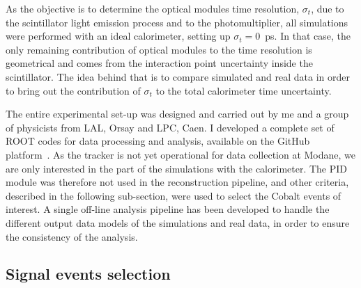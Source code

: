 As the objective is to determine the optical modules time resolution, $\sigma_{t}$, due to the scintillator light emission process and to the photomultiplier, all simulations were performed with an ideal calorimeter, setting up ${\sigma_{t}=0}$~ps.
In that case, the only remaining contribution of optical modules to the time resolution is geometrical and comes from the interaction point uncertainty inside the scintillator.
The idea behind that is to compare simulated and real data in order to bring out the contribution of $\sigma_{t}$ to the total calorimeter time uncertainty.



The entire experimental set-up was designed and carried out by me and a group of physicists from LAL, Orsay and LPC, Caen.
I developed a complete set of ROOT codes for data processing and analysis, available on the GitHub platform~\cite{myGit}.
As the tracker is not yet operational for data collection at Modane, we are only interested in the part of the simulations with the calorimeter.
The PID module was therefore not used in the reconstruction pipeline, and other criteria, described in the following sub-section, were used to select the Cobalt events of interest.
A single off-line analysis pipeline has been developed to handle the different output data models of the simulations and real data, in order to ensure the consistency of the analysis.

\subsection{Signal events selection}
\label{subsec:Co_datacut}

